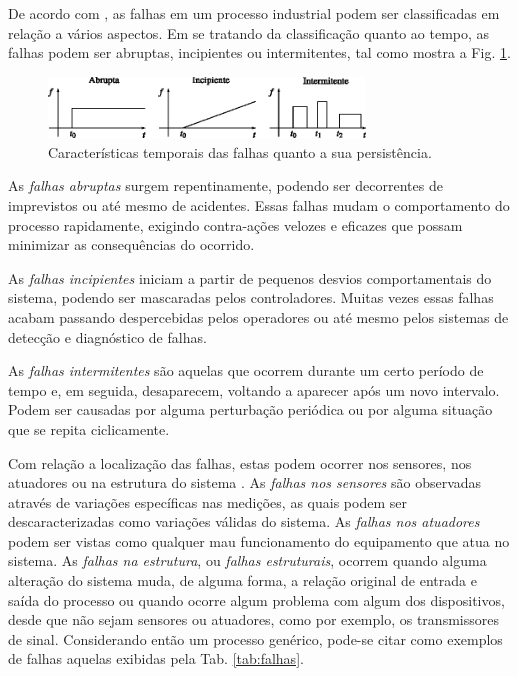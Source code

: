 De acordo com , as falhas em um processo industrial podem
ser classificadas em relação a vários aspectos. Em se tratando da classificação
quanto ao tempo, as falhas podem ser abruptas, incipientes ou intermitentes, tal
como mostra a Fig. \ref{fig:tipos_falha}.

\begin{figure}[H]
\centering
    \includegraphics[width=0.75\textwidth]{imgs/detec_diag/eps/tipos_falha}
    \caption{Características temporais das falhas quanto a sua persistência.}
    \label{fig:tipos_falha}
\end{figure}

As {\it falhas abruptas} surgem repentinamente, podendo ser decorrentes de
imprevistos ou até mesmo de acidentes. Essas falhas mudam o comportamento do
processo rapidamente, exigindo contra-ações velozes e eficazes que possam
minimizar as consequências do ocorrido.

As {\it falhas incipientes} iniciam a partir de pequenos desvios comportamentais
do sistema, podendo ser mascaradas pelos controladores. Muitas vezes essas
falhas acabam passando despercebidas pelos operadores ou até mesmo pelos
sistemas de detecção e diagnóstico de falhas.

As {\it falhas intermitentes} são aquelas que ocorrem durante um certo período
de tempo e, em seguida, desaparecem, voltando a aparecer após um novo intervalo.
Podem ser causadas por alguma perturbação periódica ou por alguma situação que
se repita ciclicamente.

Com relação a localização das falhas, estas podem ocorrer nos sensores, nos
atuadores ou na estrutura do sistema \cite{silva:2008}. As {\it falhas nos
sensores} são observadas através de variações específicas nas medições, as quais
podem ser descaracterizadas como variações válidas do sistema. As {\it falhas
nos atuadores} podem ser vistas como qualquer mau funcionamento do equipamento
que atua no sistema. As {\it falhas na estrutura}, ou {\it falhas estruturais},
ocorrem quando alguma alteração do sistema muda, de alguma forma, a relação
original de entrada e saída do processo ou quando ocorre algum problema com
algum dos dispositivos, desde que não sejam sensores ou atuadores, como por
exemplo, os transmissores de sinal. Considerando então um processo genérico,
pode-se citar como exemplos de falhas aquelas exibidas pela Tab.
\ref{tab:falhas}.

